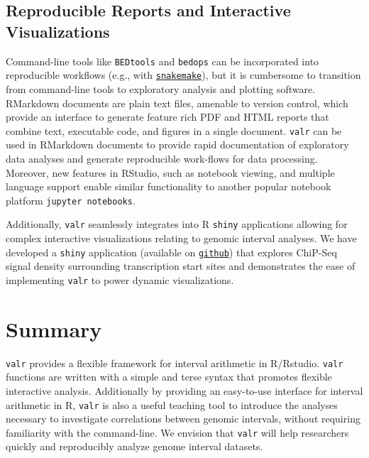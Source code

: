 \documentclass[9pt,a4paper]{extarticle}
\begin{document}
\subsection*{Reproducible Reports and Interactive Visualizations}
Command-line tools like \texttt{BEDtools} and \texttt{bedops} can be incorporated into reproducible workflows (e.g., with
\href{https://bitbucket.org/snakemake/snakemake/wiki/Home}{\texttt{snakemake}}\cite{koster_snakemakescalable_2012}),
but it is cumbersome to transition from command-line tools to exploratory analysis and plotting software. RMarkdown documents are plain text files, amenable to version control, which provide an interface to generate feature rich PDF and HTML reports that combine text, executable code, and figures in a single document. \texttt{valr} can be used in RMarkdown documents to provide rapid documentation of exploratory data analyses and generate reproducible work-flows for data processing.  Moreover, new features in RStudio, such as notebook viewing, and multiple language support enable similar functionality to another popular notebook platform \texttt{jupyter notebooks}.

Additionally, \texttt{valr} seamlessly integrates into R \texttt{shiny}{\cite{chang_shiny_2017}} applications allowing for complex interactive visualizations relating to genomic interval analyses. We have developed a \texttt{shiny} application (available on \href{https://github.com/rnabioco/valrdata}{\texttt{github}}) that explores ChiP-Seq signal density surrounding transcription start sites and demonstrates the ease of implementing \texttt{valr} to power dynamic visualizations.

\section*{Summary} %
\texttt{valr} provides a flexible framework for interval arithmetic in R/Rstudio. \texttt{valr} functions are written with a simple and terse syntax that promotes flexible interactive analysis. Additionally by providing an easy-to-use interface for interval arithmetic in R, \texttt{valr} is also a useful teaching tool to introduce the analyses necessary to investigate correlations between genomic intervals, without requiring familiarity with the command-line. We envision that \texttt{valr} will help researchers quickly and reproducibly analyze genome interval datasets.
\end{document}
